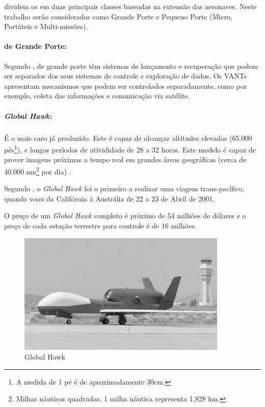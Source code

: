 \cite{Drew2005} dividem os \vants em duas principais classes baseadas na extensão das aeronaves. Neste trabalho serão consideradas como Grande Porte e Pequeno Porte (Micro, Portáteis e Multi-missões).


\addtocounter{footnote}{1}

\paragraph{\vants de Grande Porte:}
Segundo \cite{Drew2005}, \vants de grande porte têm sistemas de lançamento e recuperação que podem ser separados dos seus sistemas de controle e exploração de dados. Os VANTs apresentam mecanismos que podem ser controlados separadamente, como por exemplo, coleta das informações e comunicação via satélite.



 \subparagraph{\emph{Global Hawk}: }

 É o \vant mais caro já produzido. Este \vant é capaz de alcançar altitudes elevadas (65.000 pés\footnote{A medida de 1 pé é de aproximadamente 30cm.}), e longos períodos de ativididade de 28 a 32 horas. Este modelo é capaz de prover imagens próximas a tempo real em grandes áreas geográficas (cerca de 40.000 nm\footnote{Milhas náuticas quadradas. 1 milha náutica representa 1,828 km.} por dia) \cite{uav_roadmap2005}.

Segundo \cite{Drew2005}, o \emph{Global Hawk} foi o primeiro \vant a realizar uma viagem trans-pacífico, quando voou da Califórnia à Austrália de 22 a 23 de Abril de 2001.

O preço de um \emph{Global Hawk} completo é próximo de 54 milhões de dólares e o preço de cada estação terrestre para controle
é de 16 milhões.

\begin{figure}[h!]
\centering
\includegraphics[width=10cm]{pictures/global_hawk.png}
\caption{Global Hawk}
 \label{fig:global_hawk}
\end{figure}


